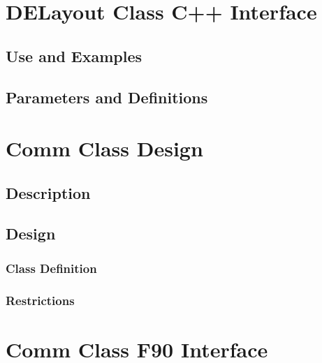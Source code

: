 \documentclass[]{article}
\begin{document}
\section{DELayout Class C++ Interface}

\subsection{Use and Examples}




\subsection{Parameters and Definitions}

%







\section{Comm Class Design}

\subsection{Description}




\subsection{Design}




\subsubsection{Class Definition}




\subsubsection{Restrictions}

%


\section{Comm Class F90 Interface}
\end{document}
